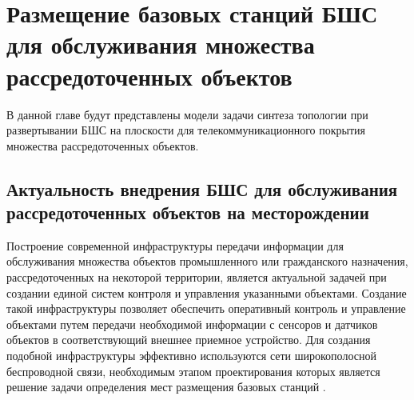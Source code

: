 \chapter{Размещение базовых станций БШС для обслуживания множества рассредоточенных объектов}\label{ch:ch3}
 
В данной главе будут представлены модели задачи синтеза топологии при развертывании БШС на плоскости для телекоммуникационного покрытия множества рассредоточенных объектов. 

\section{Актуальность внедрения БШС для обслуживания рассредоточенных объектов на месторождении}

Построение современной инфраструктуры передачи информации для обслуживания множества объектов промышленного или гражданского назначения, рассредоточенных на некоторой территории, является актуальной задачей при создании единой систем контроля и управления указанными объектами.  Создание такой инфраструктуры позволяет обеспечить оперативный контроль и управление объектами путем передачи необходимой информации с сенсоров и датчиков объектов в соответствующий внешнее приемное устройство. Для создания подобной инфраструктуры эффективно используются сети широкополосной беспроводной связи, необходимым этапом проектирования которых является решение задачи определения мест размещения базовых станций \cite{VishnevskyBook}.


